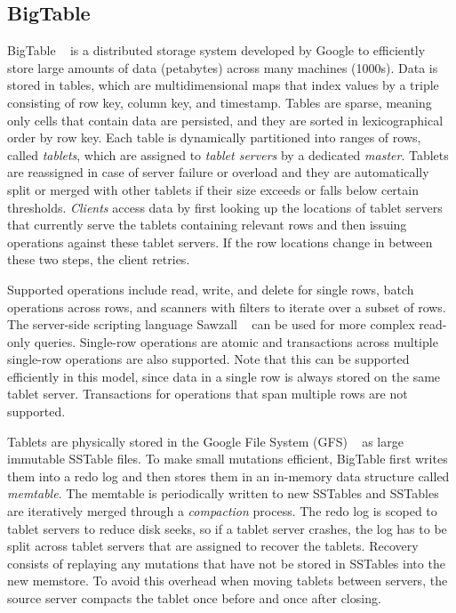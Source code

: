 \documentclass[10pt,final,journal]{IEEEtran}
\begin{document}
\subsection{BigTable}
BigTable ~\cite{Chang:2006:BDS:1267308.1267323} is a distributed storage system developed by Google to efficiently store large amounts of data (petabytes) across many machines (1000s). Data is stored in tables, which are multidimensional maps that index values by a triple consisting of row key, column key, and timestamp. Tables are sparse, meaning only cells that contain data are persisted, and they are sorted in lexicographical order by row key. Each table is dynamically partitioned into ranges of rows, called \emph{tablets}, which are assigned to \emph{tablet servers} by a dedicated \emph{master}. Tablets are reassigned in case of server failure or overload and they are automatically split or merged with other tablets if their size exceeds or falls below certain thresholds. \emph{Clients } access data by first looking up the locations of tablet servers that currently serve the tablets containing relevant rows and then issuing operations against these tablet servers. If the row locations change in between these two steps, the client retries.

Supported operations include read, write, and delete for single rows, batch operations across rows, and scanners with filters to iterate over a subset of rows. The server-side scripting language Sawzall ~\cite{Pike:2005} can be used for more complex read-only queries. Single-row operations are atomic and transactions across multiple single-row operations are also supported. Note that this can be supported efficiently in this model, since data in a single row is always stored on the same tablet server. Transactions for operations that span multiple rows are not supported.

Tablets are physically stored in the Google File System (GFS) ~\cite{Ghemawat:2003:GFS:1165389.945450} as large immutable SSTable files. To make small mutations efficient, BigTable first writes them into a redo log and then stores them in an in-memory data structure called \emph{memtable}. The memtable is periodically written to new SSTables and SSTables are iteratively merged through a \emph{compaction} process. The redo log is scoped to tablet servers to reduce disk seeks, so if a tablet server crashes, the log has to be split across tablet servers that are assigned to recover the tablets. Recovery consists of replaying any mutations that have not be stored in SSTables into the new memstore. To avoid this overhead when moving tablets between servers, the source server compacts the tablet once before and once after closing.
\end{document}
